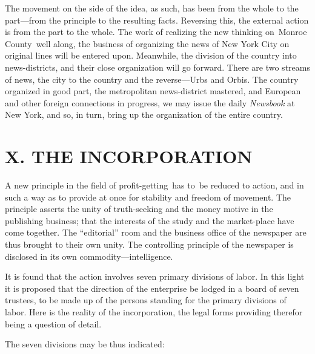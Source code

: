 \documentclass[openany,nobib]{tufte-book}
\begin{document}
The movement on the side of the idea, as such, has been from the whole
to the part---from the principle to the resulting facts. Reversing this,
the external action is from the part to the whole. The work of realizing
the new thinking on~Monroe County~well along, the business of organizing
the news of New York City on original lines will be entered upon.
Meanwhile, the division of the country into news-districts, and their
close organization will go forward. There are two streams of news, the
city to the country and the reverse---Urbs and Orbis. The country
organized in good part, the metropolitan news-district mastered, and
European and other foreign connections in progress, we may issue the
daily \emph{Newsbook} at New York, and so, in turn, bring up the
organization of the entire country.~

\hypertarget{x-the-incorporation}{%
\section{X. THE INCORPORATION}\label{x-the-incorporation}}

A new principle in the field of profit-getting~has to~be reduced to
action, and in such a way as to provide at once for stability and
freedom of movement. The principle asserts the unity of truth-seeking
and the money motive in the publishing business; that the interests of
the study and the market-place have come together. The ``editorial''
room and the business office of the newspaper are thus brought to their
own unity. The controlling principle of the newspaper is disclosed in
its own commodity---intelligence.~~

It is found that the action involves seven primary divisions of labor.
In this light it is proposed that the direction of the enterprise be
lodged in a board of seven trustees, to be made up of the persons
standing for the primary divisions of labor. Here is the reality of the
incorporation, the legal forms providing therefor being a question of
detail.~

The seven divisions may be thus indicated:~
\end{document}
